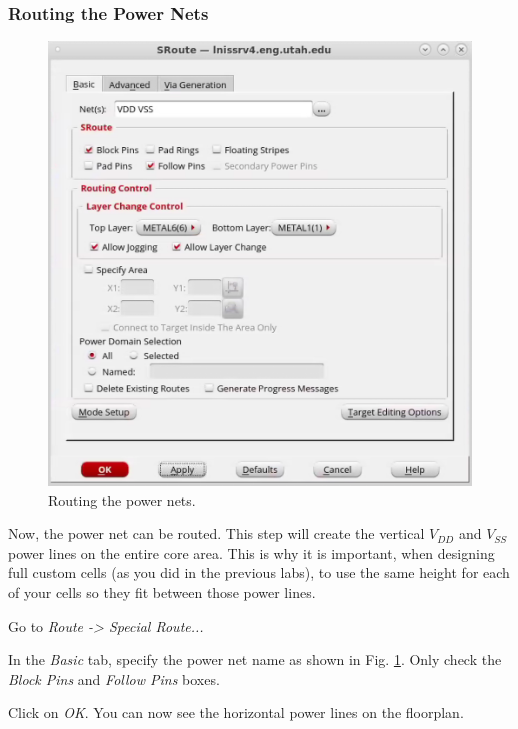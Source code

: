 \clearpage

\subsubsection{Routing the Power Nets}
\begin{enumerate}
	\parbox[t]{\dimexpr\textwidth-\leftmargin}{%
		\begin{figure}
			\vspace{0mm}
			\centering
			\vspace{-\baselineskip}
			\includegraphics[scale=0.45]{figures/lab5_backend/routesc_options}
			\caption{Routing the power nets.}
			\label{fig_specialroute}
		\end{figure}
	Now, the power net can be routed. This step will create the vertical $V_{DD}$ and $V_{SS}$ power lines on the entire core area. This is why it is important, when designing full custom cells (as you did in the previous labs), to use the same height for each of your cells so they fit between those power lines.
		\item Go to \textit{Route -> Special Route...}
		\item In the \textit{Basic} tab, specify the power net name as shown in Fig. \ref{fig_specialroute}. Only check the \textit{Block Pins} and \textit{Follow Pins} boxes.
		\item Click on \textit{OK}.	You can now see the horizontal power lines on the floorplan.
	} 
\end{enumerate}
